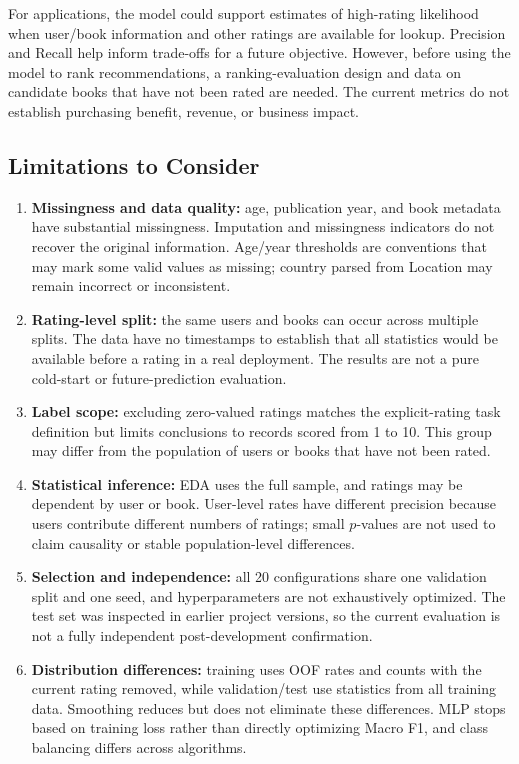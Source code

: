 \documentclass[12pt,a4paper]{article}
\begin{document}
For applications, the model could support estimates of high-rating likelihood when user/book
information and other ratings are available for lookup. Precision and Recall help inform trade-offs
for a future objective. However, before using the model to rank recommendations, a ranking-evaluation
design and data on candidate books that have not been rated are needed. The current metrics do not
establish purchasing benefit, revenue, or business impact.

\subsection{Limitations to Consider}\label{sec:limitations}
\begin{enumerate}
  \item \textbf{Missingness and data quality:} age, publication year, and book metadata have
  substantial missingness. Imputation and missingness indicators do not recover the original
  information. Age/year thresholds are conventions that may mark some valid values as missing;
  country parsed from Location may remain incorrect or inconsistent.
  \item \textbf{Rating-level split:} the same users and books can occur across multiple splits.
  The data have no timestamps to establish that all statistics would be available before a rating
  in a real deployment. The results are not a pure cold-start or future-prediction evaluation.
  \item \textbf{Label scope:} excluding zero-valued ratings matches the explicit-rating task
  definition but limits conclusions to records scored from 1 to 10. This group may differ from the
  population of users or books that have not been rated.
  \item \textbf{Statistical inference:} EDA uses the full sample, and ratings may be dependent by
  user or book. User-level rates have different precision because users contribute different
  numbers of ratings; small $p$-values are not used to claim causality or stable population-level
  differences.
  \item \textbf{Selection and independence:} all 20 configurations share one validation split and
  one seed, and hyperparameters are not exhaustively optimized. The test set was inspected in earlier
  project versions, so the current evaluation is not a fully independent post-development confirmation.
  \item \textbf{Distribution differences:} training uses OOF rates and counts with the current
  rating removed, while validation/test use statistics from all training data. Smoothing reduces
  but does not eliminate these differences. MLP stops based on training loss rather than directly
  optimizing Macro F1, and class balancing differs across algorithms.
\end{enumerate}
\end{document}
